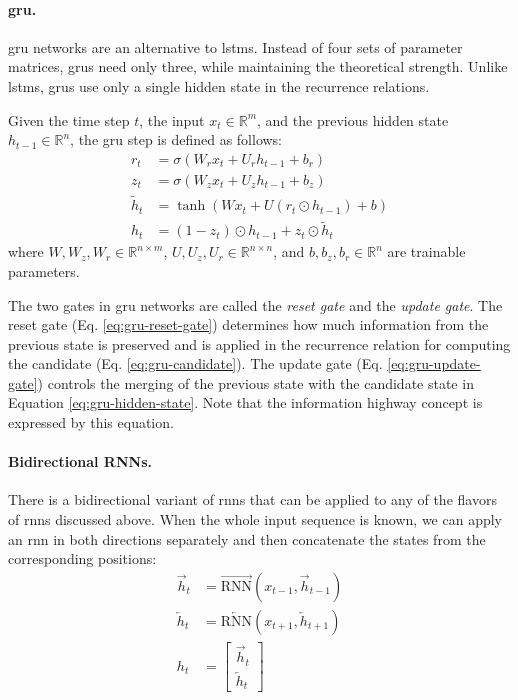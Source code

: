 \paragraph{\acs{gru}.} \acl{gru} networks \citep{cho-etal-2014-properties} are
an alternative to \acp{lstm}. Instead of four sets of parameter matrices,
\acp{gru} need only three, while maintaining the theoretical strength. Unlike
\acp{lstm}, \acp{gru} use only a single hidden state in the recurrence
relations.

Given the time step $t$, the input $x_t \in \mathbb{R}^m$, and the previous
hidden state $h_{t-1} \in \mathbb{R}^n$, the \ac{gru} step is defined as
follows:
%
\begin{align}
  r_t &= \sigma\left(W_r x_t + U_r h_{t-1} + b_r\right) \label{eq:gru-reset-gate} \\
  z_t &= \sigma\left(W_z x_t + U_z h_{t-1} + b_z\right) \label{eq:gru-update-gate} \\
  \tilde{h}_t &= \tanh \left(W x_t + U \left( r_t \odot h_{t-1} \right) + b \right) \label{eq:gru-candidate} \\
  h_t &= (1 - z_t) \odot h_{t-1} + z_t \odot \tilde{h}_t \label{eq:gru-hidden-state}
\end{align}
%
where $W, W_z, W_r \in \mathbb{R}^{n\times m}$,
$U, U_z, U_r \in \mathbb{R}^{n \times n}$, and $b, b_z, b_r \in \mathbb{R}^n$
are trainable parameters.

The two gates in \ac{gru} networks are called the \emph{reset gate} and the
\emph{update gate}.  The reset gate (Eq. \ref{eq:gru-reset-gate}) determines
how much information from the previous state is preserved and is applied in the
recurrence relation for computing the candidate
(Eq. \ref{eq:gru-candidate}). The update gate (Eq.  \ref{eq:gru-update-gate})
controls the merging of the previous state with the candidate state in Equation
\ref{eq:gru-hidden-state}. Note that the information highway concept is
expressed by this equation.

\paragraph{Bidirectional RNNs.} There is a bidirectional variant of \acp{rnn}
that can be applied to any of the flavors of \acp{rnn} discussed above. When
the whole input sequence is known, we can apply an \ac{rnn} in both directions
separately and then concatenate the states from the corresponding positions:
%
\begin{align}
  \overrightarrow{h}_t &= \overrightarrow{\mathrm{RNN}}(x_{t-1}, \overrightarrow{h}_{t-1}) \\
  \overleftarrow{h}_t &= \overleftarrow{\mathrm{RNN}}(x_{t+1}, \overleftarrow{h}_{t+1}) \\
  h_t &= \left[ \begin{matrix} \overrightarrow{h}_t \\ \overleftarrow{h}_t \end{matrix} \right]
\end{align}

